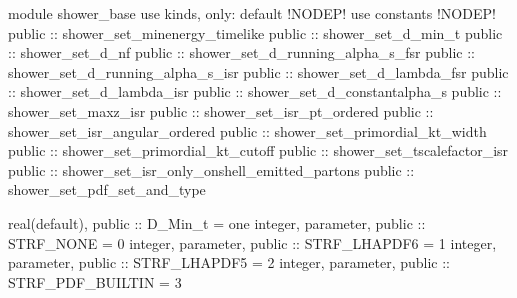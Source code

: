 module shower_base
  use kinds, only: default !NODEP!
  use constants !NODEP!
  public :: shower_set_minenergy_timelike
  public :: shower_set_d_min_t
  public :: shower_set_d_nf
  public :: shower_set_d_running_alpha_s_fsr
  public :: shower_set_d_running_alpha_s_isr
  public :: shower_set_d_lambda_fsr
  public :: shower_set_d_lambda_isr
  public :: shower_set_d_constantalpha_s
  public :: shower_set_maxz_isr
  public :: shower_set_isr_pt_ordered
  public :: shower_set_isr_angular_ordered
  public :: shower_set_primordial_kt_width
  public :: shower_set_primordial_kt_cutoff
  public :: shower_set_tscalefactor_isr
  public :: shower_set_isr_only_onshell_emitted_partons
  public :: shower_set_pdf_set_and_type

  real(default), public :: D_Min_t = one
  integer, parameter, public :: STRF_NONE = 0
  integer, parameter, public :: STRF_LHAPDF6 = 1
  integer, parameter, public :: STRF_LHAPDF5 = 2
  integer, parameter, public :: STRF_PDF_BUILTIN = 3
  
